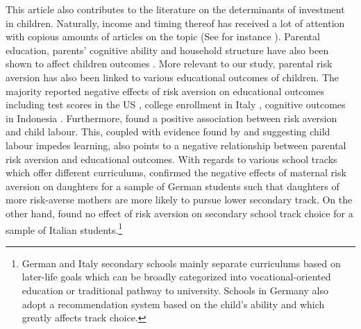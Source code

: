 \documentclass[emulatestandardclasses, 10pt, abstract = true]{scrartcl}
\begin{document}
This article also contributes to the literature on the determinants of investment in children. Naturally, income and timing thereof has received a lot of attention with copious amounts of articles on the topic (See for instance \citet{brooks1997effects, yeung2002money, carneiro2003human,dahl2012impact, carneiro2016partial, attanasio2020human}). Parental education, parents' cognitive ability and household structure have also been shown to affect children outcomes \citep{chevalier2004parental, brown2004family, guryan2008parental, schady2011parents}. More relevant to our study, parental risk aversion has also been linked to various educational outcomes of children. The majority reported negative effects of risk aversion on educational outcomes including test scores in the US \citep{brown2012parental}, college enrollment in Italy \citep{checchi2014parents}, cognitive outcomes in Indonesia \citep{hartarto2023parental}. Furthermore, \citet{frempong2021risk} found a positive association between risk aversion and child labour. This, coupled with evidence found by \citet{HEADY2003385} and \citet{bezerra2009impact} suggesting child labour impedes learning, also points to a negative relationship between parental risk aversion and educational outcomes. With regards to various school tracks which offer different curriculums, \citet{wolfel2012parental} confirmed the negative effects of maternal risk aversion on daughters for a sample of German students such that daughters of more risk-averse mothers are more likely to pursue lower secondary track. On the other hand, \citet{leonardi2007parents} found no effect of risk aversion on secondary school track choice for a sample of Italian students.\footnote{German and Italy secondary schools mainly separate curriculums based on later-life goals which can be broadly categorized into vocational-oriented education or traditional pathway to university. Schools in Germany also adopt a recommendation system based on the child's ability and which greatly affects track choice.}   
\end{document}
